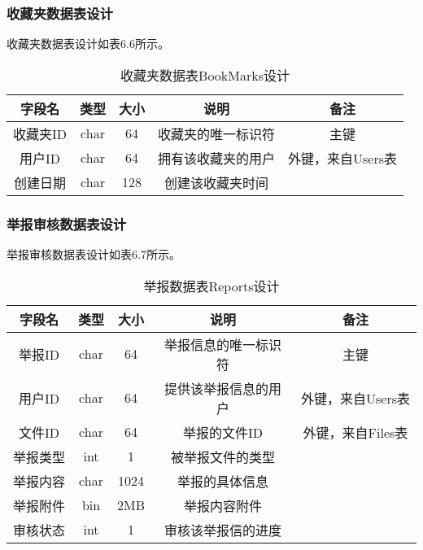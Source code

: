 \subsubsection{收藏夹数据表设计}
收藏夹数据表设计如表6.6所示。
\begin{table}[htbp]
\centering
\caption{收藏夹数据表BookMarks设计} \label{tab:bookmarks-database}
\begin{tabular}{|c|c|c|c|c|}
    \hline
    字段名 & 类型 & 大小 & 说明 & 备注 \\
    \hline
    收藏夹ID & char & 64 & 收藏夹的唯一标识符 & 主键\\
    \hline
    用户ID & char & 64 & 拥有该收藏夹的用户 & 外键，来自Users表\\
    \hline
    创建日期 & char & 128 & 创建该收藏夹时间 & \\
    \hline
\end{tabular}
\end{table}

\subsubsection{举报审核数据表设计}
举报审核数据表设计如表6.7所示。  
\begin{table}[htbp]
\centering
\caption{举报数据表Reports设计} \label{tab:reports-database}
\begin{tabular}{|c|c|c|c|c|}
    \hline
    字段名 & 类型 & 大小 & 说明 & 备注 \\
    \hline
    举报ID & char & 64 & 举报信息的唯一标识符 & 主键\\
    \hline
    用户ID & char & 64 & 提供该举报信息的用户 & 外键，来自Users表\\
    \hline
    文件ID & char & 64 & 举报的文件ID & 外键，来自Files表\\
    \hline
    举报类型 & int & 1 & 被举报文件的类型 & \\
    \hline
    举报内容 & char & 1024 & 举报的具体信息 & \\
    \hline
    举报附件 & bin & 2MB & 举报内容附件 & \\
    \hline
    审核状态 & int & 1 & 审核该举报信的进度 & \\
    \hline
\end{tabular}
\end{table}

